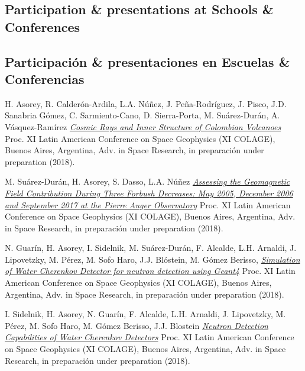 \ifeng
\subsection*{Participation \& presentations at Schools \& Conferences}
\else
\subsection*{Participación \& presentaciones en Escuelas \& Conferencias}
\fi
\noindent
\begin{etaremune}

\item {} H. Asorey, R. Calderón-Ardila, L.A. Núñez, J. Peña-Rodríguez, J. Pisco, J.D. Sanabria Gómez, C. Sarmiento-Cano, D. Sierra-Porta, M. Suárez-Durán, A. Vásquez-Ramírez \href{}{\emph{Cosmic Rays and Inner Structure of Colombian Volcanoes}} \en Proc. XI Latin American Conference on Space Geophysics (XI COLAGE), Buenos Aires, Argentina, Adv. in Space Research, \ifeng in preparación \else under preparation \fi (2018). %

\item {} M. Suárez-Durán, H. Asorey, S. Dasso, L.A. Núñez \href{}{\emph{Assessing the Geomagnetic Field Contribution During Three Forbush Decreases: May 2005, December 2006 and September 2017 at the Pierre Auger Observatory}} \en Proc. XI Latin American Conference on Space Geophysics (XI COLAGE), Buenos Aires, Argentina, Adv. in Space Research, \ifeng in preparación \else under preparation \fi (2018). %

\item {} N. Guarín, H. Asorey, I. Sidelnik, M. Suárez-Durán, F. Alcalde, L.H. Arnaldi, J. Lipovetzky, M. Pérez, M. Sofo Haro, J.J. Blóstein, M. Gómez Berisso, \href{}{\emph{Simulation of Water Cherenkov Detector for neutron detection using Geant4}} \en Proc. XI Latin American Conference on Space Geophysics (XI COLAGE),  Buenos Aires, Argentina, Adv. in Space Research, \ifeng in preparación \else under preparation \fi (2018). %

\item {} I. Sidelnik, H. Asorey, N. Guarín, F. Alcalde, L.H. Arnaldi, J. Lipovetzky, M. Pérez, M. Sofo Haro, M. Gómez Berisso, J.J. Blostein \href{}{\emph{Neutron Detection Capabilities of Water Cherenkov Detectors}} \en Proc. XI Latin American Conference on Space Geophysics (XI COLAGE),  Buenos Aires, Argentina, Adv. in Space Research, \ifeng in preparación \else under preparation \fi (2018). %


\end{etaremune}
